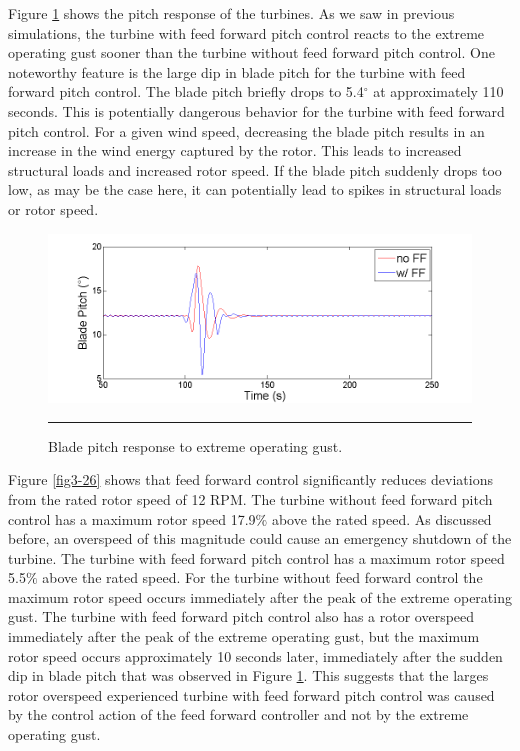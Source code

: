 Figure \ref{fig3-25} shows the pitch response of the turbines. As we saw in previous simulations, the turbine with feed forward pitch control reacts to the extreme operating gust sooner than the turbine without feed forward pitch control. One noteworthy feature is the large dip in blade pitch for the turbine with feed forward pitch control. The blade pitch briefly drops to 5.4$^\circ$ at approximately 110 seconds. This is potentially dangerous behavior for the turbine with feed forward pitch control. For a given wind speed, decreasing the blade pitch results in an increase in the wind energy captured by the rotor. This leads to increased structural loads and increased rotor speed. If the blade pitch suddenly drops too low, as may be the case here, it can potentially lead to spikes in structural loads or rotor speed. 

\begin{figure}[htbp]
	\centering
		\includegraphics[trim = {1cm 0 2cm 0}, clip, width = \linewidth]{Figures/ch3Figures/fig3-25.png}
		\rule{35em}{0.5pt}
	\caption{Blade pitch response to extreme operating gust. }
	\label{fig3-25}
\end{figure}

Figure \ref{fig3-26} shows that feed forward control significantly reduces deviations from the rated rotor speed of 12 RPM. The turbine without feed forward pitch control has a maximum rotor speed 17.9$\%$ above the rated speed. As discussed before, an overspeed of this magnitude could cause an emergency shutdown of the turbine. The turbine with feed forward pitch control has a maximum rotor speed 5.5$\%$ above the rated speed. For the turbine without feed forward control the maximum rotor speed occurs immediately after the peak of the extreme operating gust. The turbine with feed forward pitch control also has a rotor overspeed immediately after the peak of the extreme operating gust, but the maximum rotor speed occurs approximately 10 seconds later, immediately after the sudden dip in blade pitch that was observed in Figure \ref{fig3-25}. This suggests that the larges rotor overspeed experienced turbine with feed forward pitch control was caused by the control action of the feed forward controller and not by the extreme operating gust.

